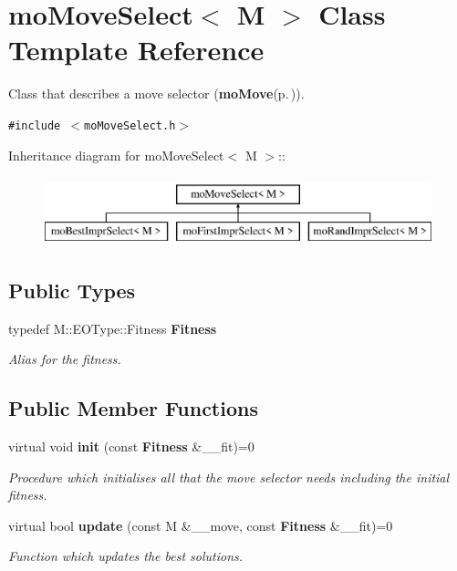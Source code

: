 \section{mo\-Move\-Select$<$ M $>$ Class Template Reference}
\label{classmo_move_select}
Class that describes a move selector ({\bf mo\-Move}{\rm (p.\,\pageref{classmo_move})}).  


{\tt \#include $<$mo\-Move\-Select.h$>$}

Inheritance diagram for mo\-Move\-Select$<$ M $>$::\begin{figure}[H]
\begin{center}
\leavevmode
\includegraphics[height=2cm]{classmo_move_select}
\end{center}
\end{figure}
\subsection*{Public Types}
\begin{CompactItemize}
\item 
typedef M::EOType::Fitness {\bf Fitness}\label{classmo_move_select_8148ccc0e6fbd209c3fe6829559895c8}

\begin{CompactList}\small\item\em Alias for the fitness. \item\end{CompactList}\end{CompactItemize}
\subsection*{Public Member Functions}
\begin{CompactItemize}
\item 
virtual void {\bf init} (const {\bf Fitness} \&\_\-\_\-fit)=0
\begin{CompactList}\small\item\em Procedure which initialises all that the move selector needs including the initial fitness. \item\end{CompactList}\item 
virtual bool {\bf update} (const M \&\_\-\_\-move, const {\bf Fitness} \&\_\-\_\-fit)=0
\begin{CompactList}\small\item\em Function which updates the best solutions. \item\end{CompactList}\end{CompactItemize}


